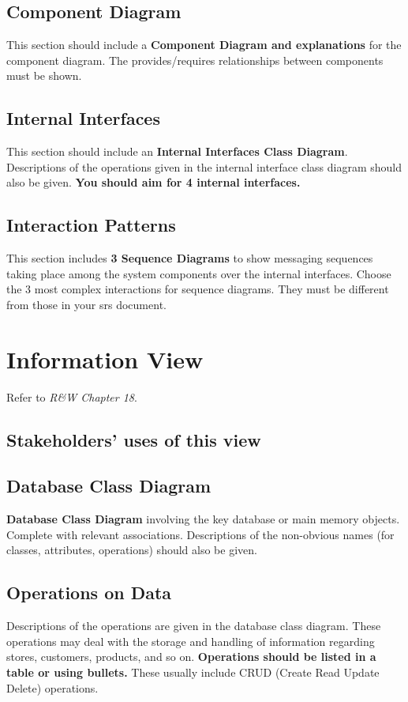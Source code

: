 \subsection{Component Diagram}

This section should include a \textbf{Component Diagram and explanations} for the component diagram. The provides/requires relationships between components must be shown.

\subsection{Internal Interfaces}
This section should include an \textbf{Internal Interfaces Class Diagram}. Descriptions of the operations given in the internal interface class diagram should also be given. \textbf{You should aim for 4 internal interfaces.}

\subsection{Interaction Patterns}
This section includes \textbf{3 Sequence Diagrams} to show messaging sequences taking place among the system components over the internal interfaces. Choose the 3 most complex interactions for sequence diagrams. They must be different from those in your \gls{srs} document.



\section{Information View}

Refer to \textit{R\&W Chapter 18}. 

\subsection{Stakeholders’ uses of this view}

\subsection{Database Class Diagram}

\textbf{Database Class Diagram} involving the key database or main memory objects. Complete with relevant associations. Descriptions of the non-obvious names (for classes, attributes, operations) should also be given.

\subsection{Operations on Data}
Descriptions of the operations are given in the database class diagram. These operations may deal with the storage and handling of information regarding stores, customers, products, and so on. \textbf{Operations should be listed in a table or using bullets.}
These usually include CRUD (Create Read Update Delete) operations.



